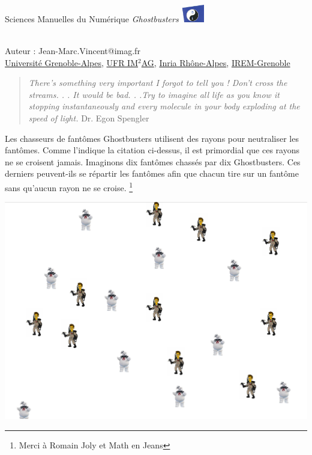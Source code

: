 \documentclass[a4paper,11pt,fleqn]{article}
\begin{document}
\thispagestyle{empty}

\vspace{-2cm}
\noindent
{\Large {Sciences Manuelles du Numérique \textit{Ghostbusters}} }\hfill \includegraphics[width=1cm]{logos/isi2.jpg}

\noindent \hrulefill

\noindent
\textbf{}\\
\noindent
Auteur : Jean-Marc.Vincent@imag.fr\\
\noindent
\href{http://www.ujf-grenoble.fr/}{Université Grenoble-Alpes}, \href{http://ufrima.imag.fr/}{UFR IM$^\text{2}$AG},  \href{http://www.inria.fr/}{Inria Rhône-Alpes}, \href{http://www-irem.ujf-grenoble.fr/}{IREM-Grenoble}

\begin{quotation}
\textit{
There's something very important I forgot to tell you ! Don't cross the streams. . . It
would be bad. . .Try to imagine all life as you know it stopping instantaneously
and every molecule in your body exploding at the speed of light.}
Dr. Egon Spengler
\end{quotation}
Les chasseurs de fantômes Ghostbusters utilisent des rayons pour neutraliser les fantômes.
Comme l'indique la citation ci-dessus, il est primordial que ces rayons ne se croisent jamais.
Imaginons dix fantômes chassés par dix Ghostbusters. Ces derniers peuvent-ils se répartir
les fantômes afin que chacun tire sur un fantôme sans qu'aucun rayon ne se croise. \footnote{Merci à Romain Joly et Math en Jeans}
\begin{center}
\includegraphics[width=0.4\linewidth]{figures/ghostbusters.pdf}
\end{center}
\end{document}

